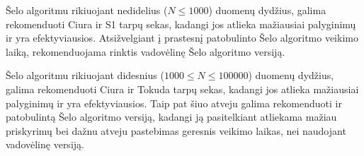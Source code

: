 \documentclass{VUMIFInfKursinis}
\begin{document}
Šelo algoritmu rikiuojant nedidelius ($N \leq 1000$) duomenų dydžius,
galima rekomenduoti Ciura ir S1 tarpų sekas, kadangi jos atlieka mažiausiai palyginimų ir yra efektyviausios.
Atsižvelgiant į prastesnį patobulinto Šelo algoritmo veikimo laiką,
rekomenduojama rinktis vadovėlinę Šelo algoritmo versiją.

Šelo algoritmu rikiuojant didesnius ($1000 \leq N \leq 100000$) duomenų dydžius, galima rekomenduoti Ciura ir Tokuda tarpų sekas,
kadangi jos atlieka mažiausiai palyginimų ir yra efektyviausios.
Taip pat šiuo atveju galima rekomenduoti ir patobulintą Šelo algoritmo versiją,
kadangi ją pasitelkiant atliekama mažiau priskyrimų bei dažnu atveju pastebimas geresnis veikimo laikas, nei naudojant vadovėlinę versiją.



\printbibliography[heading=bibintoc] %

\end{document}
